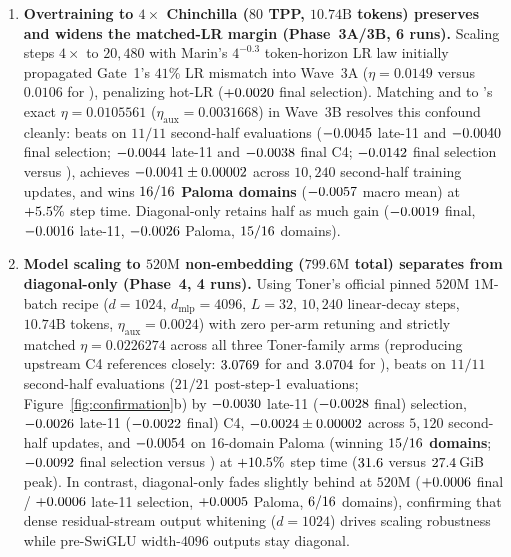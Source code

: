 \begin{enumerate}
\item \textbf{Overtraining to $4\times$ Chinchilla ($80$ TPP, $10.74\text{B}$
  tokens) preserves and widens the matched-LR margin (Phase~3A/3B, 6 runs).}
  Scaling steps $4\times$ to $20{,}480$ with Marin's $4^{-0.3}$ token-horizon LR
  law initially propagated Gate~1's $41\%$ LR mismatch into Wave~3A
  ($\eta = 0.0149$ versus $0.0106$ for ), penalizing hot-LR
   ($+0.0020{}$ final selection). Matching
   and  to 's exact
  $\eta = 0.0105561$ ($\eta_{\text{aux}} = 0.0031668$) in Wave~3B resolves this
  confound cleanly:  beats  on $11/11$
  second-half evaluations ($-0.0045{}$ late-11 and
  $-0.0040{}$ final selection; $-0.0044{}$ late-11
  and $-0.0038{}$ final C4; $-0.0142{}$
  final selection versus ), achieves
  $-0.0041{} \pm 0.00002{}$ across $10{,}240$
  second-half training updates, and wins \textbf{$16{}/16$
  Paloma domains} ($-0.0057{}$ macro mean) at
  $+5.5\%$ step time. Diagonal-only  retains half
  as much gain ($-0.0019{}$ final, $-0.0016{}$
  late-11, $-0.0026{}$ Paloma, $15{}/16$
  domains).
\item \textbf{Model scaling to $520\text{M}$ non-embedding ($799.6\text{M}$
  total) separates  from diagonal-only 
  (Phase~4, 4 runs).}
  Using Toner's official pinned $520\text{M}$ $1\text{M}$-batch recipe
  ($d=1024$, $d_{\text{mlp}}=4096$, $L=32$, $10{,}240$ linear-decay steps,
  $10.74\text{B}$ tokens, $\eta_{\text{aux}}=0.0024$) with zero per-arm retuning
  and strictly matched $\eta = 0.0226274$ across all three Toner-family arms
  (reproducing upstream C4 references closely: $3.0769{}$
  for  and $3.0704{}$ for ),
   beats  on $11/11$ second-half evaluations
  ($21/21$ post-step-1 evaluations; Figure~\ref{fig:confirmation}b) by
  $-0.0030{}$ late-11 ($-0.0028{}$ final) selection,
  $-0.0026{}$ late-11 ($-0.0022{}$ final) C4,
  $-0.0024{} \pm 0.00002{}$ across $5{,}120$
  second-half updates, and $-0.0054{}$ on 16-domain Paloma
  (winning \textbf{$15{}/16$ domains};
  $-0.0092{}$ final selection versus ) at
  $+10.5\%$ step time ($31.6{}$ versus
  $27.4{}$\,GiB peak). In contrast, diagonal-only 
  fades slightly behind  at $520\text{M}$
  ($+0.0006{}$ final / $+0.0006{}$ late-11 selection,
  $+0.0005{}$ Paloma, $6{}/16$ domains),
  confirming that dense residual-stream output whitening ($d=1024$) drives
  scaling robustness while pre-SwiGLU width-$4096$ outputs stay diagonal.
\end{enumerate}

